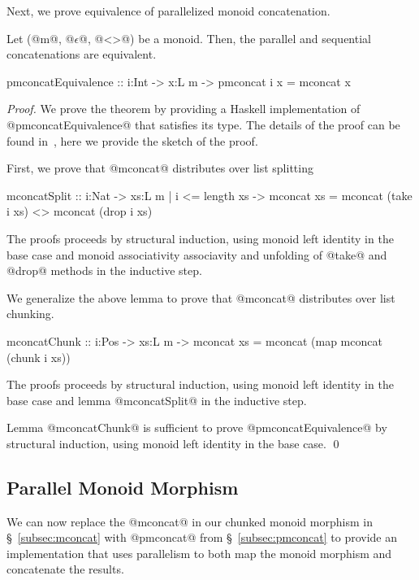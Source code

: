 Next, we prove equivalence of parallelized monoid concatenation.
%
\begin{theorem}\label{theorem:equivalence:concat}
Let (@m@, @$\epsilon$@, @<>@) be a monoid.
Then, the parallel and sequential concatenations are equivalent.
\begin{code}
pmconcatEquivalence
  :: i:Int -> x:L m -> { pmconcat i x = mconcat x }
\end{code}
\end{theorem}

\begin{proof}
We prove the theorem by providing a Haskell implementation of @pmconcatEquivalence@
that satisfies its type.
%
The details of the proof can be found in~\cite{implementation},
here we provide the sketch of the proof.

First, we prove that @mconcat@ distributes over list splitting
\begin{code}
mconcatSplit
  :: i:Nat -> xs:{L m | i <= length xs}
  -> { mconcat xs = mconcat (take i xs)
                 <> mconcat (drop i xs) }
\end{code}
%
The proofs proceeds by structural induction, using monoid left identity in the base case
and monoid associativity associavity and unfolding of @take@ and @drop@
methods in the inductive step.

We generalize the above lemma
to prove that @mconcat@ distributes over list chunking.
\begin{code}
mconcatChunk
  :: i:Pos -> xs:L m
  -> { mconcat xs = mconcat (map mconcat (chunk i xs)) }
\end{code}
%
The proofs proceeds by structural induction, using monoid left identity in the base case
and lemma @mconcatSplit@ in the inductive step.

Lemma @mconcatChunk@ is sufficient to prove @pmconcatEquivalence@ by structural induction,
using monoid left identity in the base case.
\qed\end{proof}

\subsection{Parallel Monoid Morphism}\label{subsec:both-levels}
We can now replace the @mconcat@ in our chunked monoid morphism in
\S~\ref{subsec:mconcat} with @pmconcat@ from
\S~\ref{subsec:pmconcat} to provide an implementation that uses
parallelism to both map the monoid morphism and concatenate the
results.

